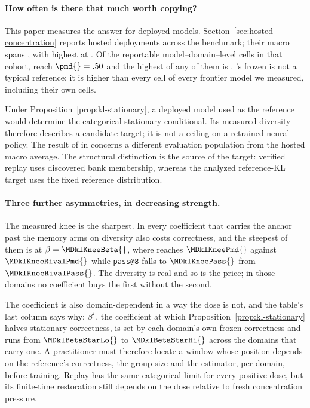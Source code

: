 \paragraph{How often is there that much worth copying?}
This paper measures the answer for deployed models.
Section~\ref{sec:hosted-concentration} reports \MDklHostedModels{} hosted
deployments across the benchmark; their macro \pmd{} spans
\MDklHostedRange{}, with \MDklHostedHiModel{} highest at \MDklHostedHi{}. Of
the \MDklHostedCells{} reportable model--domain--level cells in that cohort,
\MDklHostedCellsHalf{} reach $\pmd{}=.50$ and the highest of any of them is
\MDklHostedCellMax{}. \MDklTopFrozenDomain{}'s frozen \MDklTopFrozenPmd{} is
not a typical reference; it is higher than every cell of every frontier model
we measured, including their own \MDklTopFrozenDomain{} cells.

Under Proposition~\ref{prop:kl-stationary}, a deployed model used as the
reference would determine the categorical stationary conditional. Its
measured diversity therefore describes a candidate target; it is not a
ceiling on a retrained neural policy. The
\MDklTopMemoryArm{} result of \MDklTopMemoryPmd{} in
\MDklTopMemoryDomain{} concerns a different evaluation population from
the hosted macro average. The structural distinction is the source of the
target: verified replay uses discovered bank membership, whereas the
analyzed reference-KL target uses the fixed reference distribution.

\paragraph{Three further asymmetries, in decreasing strength.}
The measured knee is the sharpest. In \MDklPricedNames{} every coefficient
that carries the anchor past the memory arms on diversity also costs correctness,
and the steepest of them is \MDklKneeDomain{} at $\beta=\MDklKneeBeta{}$, where
\pmd{} reaches $\MDklKneePmd{}$ against $\MDklKneeRivalPmd{}$ while
\texttt{pass@8} falls to $\MDklKneePass{}$ from $\MDklKneeRivalPass{}$. The
diversity is real and so is the price; in those domains no coefficient buys the
first without the second.

The coefficient is also domain-dependent in a way the dose is not, and the
table's last column says why: $\beta^\star$, the coefficient at which
Proposition~\ref{prop:kl-stationary} halves stationary correctness, is set by
each domain's own frozen correctness and runs from $\MDklBetaStarLo{}$ to
$\MDklBetaStarHi{}$ across the domains that carry one. A practitioner must therefore locate a window whose position
depends on the reference's correctness, the group size and the estimator, per
domain, before training. Replay has the same categorical limit for every positive dose, but its
finite-time restoration still depends on the dose relative to fresh
concentration pressure.

